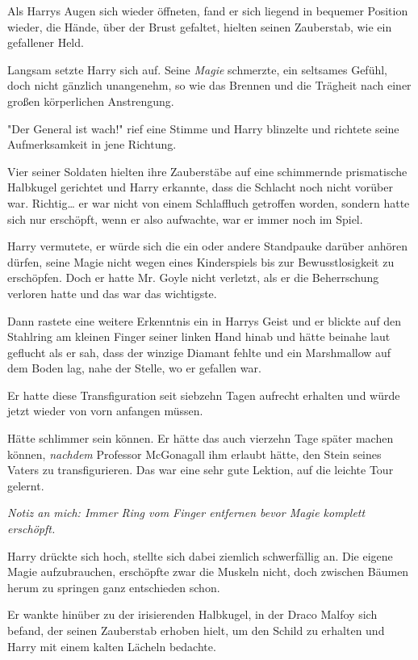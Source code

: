 {Als Harrys Augen sich wieder öffneten, fand er sich liegend in bequemer Position wieder, die Hände, über der Brust gefaltet, hielten seinen Zauberstab, wie ein gefallener Held.

Langsam setzte Harry sich auf. Seine \emph{Magie} schmerzte, ein seltsames Gefühl, doch nicht gänzlich unangenehm, so wie das Brennen und die Trägheit nach einer großen körperlichen Anstrengung.

"Der General ist wach!" rief eine Stimme und Harry blinzelte und richtete seine Aufmerksamkeit in jene Richtung.

Vier seiner Soldaten hielten ihre Zauberstäbe auf eine schimmernde prismatische Halbkugel gerichtet und Harry erkannte, dass die Schlacht noch nicht vorüber war. Richtig… er war nicht von einem Schlaffluch getroffen worden, sondern hatte sich nur erschöpft, wenn er also aufwachte, war er immer noch im Spiel.

Harry vermutete, er würde sich die ein oder andere Standpauke darüber anhören dürfen, seine Magie nicht wegen eines Kinderspiels bis zur Bewusstlosigkeit zu erschöpfen. Doch er hatte Mr. Goyle nicht verletzt, als er die Beherrschung verloren hatte und das war das wichtigste.

Dann rastete eine weitere Erkenntnis ein in Harrys Geist und er blickte auf den Stahlring am kleinen Finger seiner linken Hand hinab und hätte beinahe laut geflucht als er sah, dass der winzige Diamant fehlte und ein Marshmallow auf dem Boden lag, nahe der Stelle, wo er gefallen war.

Er hatte diese Transfiguration seit siebzehn Tagen aufrecht erhalten und würde jetzt wieder von vorn anfangen müssen.

Hätte schlimmer sein können. Er hätte das auch vierzehn Tage später machen können, \emph{nachdem} Professor McGonagall ihm erlaubt hätte, den Stein seines Vaters zu transfigurieren. Das war eine sehr gute Lektion, auf die leichte Tour gelernt.

\emph{Notiz an mich: Immer Ring vom Finger entfernen bevor Magie komplett erschöpft.}

Harry drückte sich hoch, stellte sich dabei ziemlich schwerfällig an. Die eigene Magie aufzubrauchen, erschöpfte zwar die Muskeln nicht, doch zwischen Bäumen herum zu springen ganz entschieden schon.

Er wankte hinüber zu der irisierenden Halbkugel, in der Draco Malfoy sich befand, der seinen Zauberstab erhoben hielt, um den Schild zu erhalten und Harry mit einem kalten Lächeln bedachte.

}
